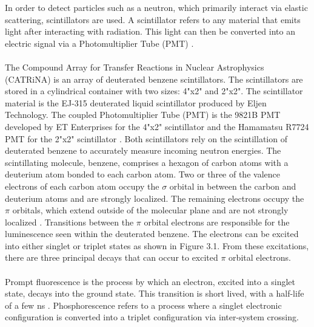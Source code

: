 \documentclass[11pt,copyright]{fsuthesis}
\begin{document}
In order to detect particles such as a neutron, which primarily interact via elastic scattering, scintillators are used.  A scintillator refers to any material that emits light after interacting with radiation. This light can then be converted into an electric signal via a Photomultiplier Tube (PMT) \cite{knoll2010radiation}.
\\ \\
The Compound Array for Transfer Reactions in Nuclear Astrophysics (CATRiNA) is an array of deuterated benzene scintillators. The scintillators are stored in a cylindrical container with two sizes: 4"x2" and 2"x2". The scintillator material is the EJ-315 deuterated liquid scintillator produced by Eljen Technology. The coupled Photomultiplier Tube (PMT) is the 9821B PMT developed by ET Enterprises for the 4"x2" scintillator and the Hamamatsu R7724 PMT for the 2"x2" scintillator \cite{ej315info} \cite{4x2pmtinfo} \cite{2x2pmtinfo}. Both scintillators rely on the scintillation of deuterated benzene to accurately measure incoming neutron energies. The scintillating molecule, benzene, comprises a hexagon of carbon atoms with a deuterium atom bonded to each carbon atom. Two or three of the valence electrons of each carbon atom occupy the $\sigma$ orbital in between the carbon and deuterium atoms and are strongly localized. The remaining electrons occupy the $\pi$ orbitals, which extend outside of the molecular plane and are not strongly localized \cite{BROOKS1979477}. Transitions between the $\pi$ orbital electrons are responsible for the luminescence seen within the deuterated benzene. The electrons can be excited into either singlet or triplet states as shown in Figure 3.1. 
From these excitations, there are three principal decays that can occur to excited $\pi$ orbital electrons. 
\\ \\
Prompt fluorescence is the process by which an electron, excited into a singlet state, decays into the ground state. This transition is short lived, with a half-life of a few ns \cite{leo1994techniques}. Phosphorescence refers to a process where a singlet electronic configuration is converted into a triplet configuration via inter-system crossing.  
\end{document}
